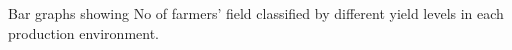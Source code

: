 Bar graphs showing No of farmers' field classified by different yield levels in each production environment.
\label{fig:yield_level_bar}